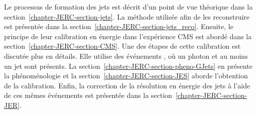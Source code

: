 Le processus de formation des jets est décrit d'un point de vue théorique dans la section~\ref{chapter-JERC-section-jets}.
La méthode utilisée afin de les reconstruire est présentée dans la section~\ref{chapter-JERC-section-jets_reco}.
Ensuite, le principe de leur calibration en énergie dans l'expérience CMS est abordé dans la section~\ref{chapter-JERC-section-CMS}.
Une des étapes de cette calibration est discutée plus en détails.
Elle utilise des événements \Gjets, où un photon et au moins un jet sont présents.
La section~\ref{chapter-JERC-section-pheno-GJets} en présente la phénoménologie
et
la section~\ref{chapter-JERC-section-JES} aborde l'obtention de la calibration.
Enfin, la correction de la résolution en énergie des jets à l'aide de ces mêmes événements est présentée dans la section~\ref{chapter-JERC-section-JER}.